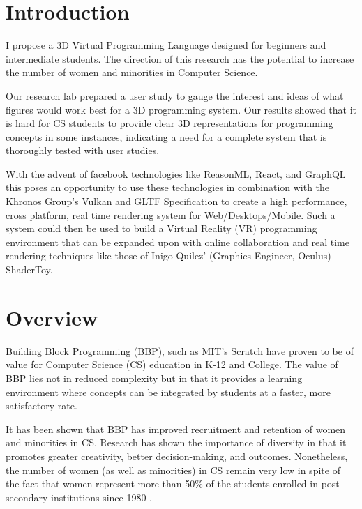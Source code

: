 \documentclass[10pt,a4paper]{article}
\begin{document}
\begin{multicols}{2}

\section{Introduction}

I propose a 3D Virtual Programming Language designed for beginners and intermediate students. The direction of this research has the potential to increase the number of women and minorities in Computer Science. 

Our research lab prepared a user study to gauge the interest and ideas of what figures would work best for a 3D programming system. Our results showed that it is hard for CS students to provide clear 3D representations for programming concepts in some instances, indicating a need for a complete system that is thoroughly tested with user studies.

With the advent of facebook technologies like ReasonML, React, and GraphQL this poses an opportunity to use these technologies in combination with the Khronos Group's Vulkan and GLTF Specification\cite{gltf} to create a high performance, cross platform, real time rendering system for Web/Desktops/Mobile. Such a system could then be used to build a Virtual Reality (VR) programming environment that can be expanded upon with online collaboration and real time rendering techniques like those of Inigo Quilez' (Graphics Engineer, Oculus) ShaderToy\cite{quilez}.

\section{Overview}

Building Block Programming (BBP), such as MIT's Scratch have proven to be of value for Computer Science (CS) education in K-12 and College. The value of BBP lies not in reduced complexity but in that it provides a learning environment where concepts can be integrated by students at a faster, more satisfactory rate.

It has been shown that BBP has improved recruitment and retention of women and minorities in CS. Research has shown the importance of diversity in that it promotes greater creativity, better decision-making, and outcomes. Nonetheless, the number of women (as well as minorities) in CS remain very low in spite of the fact that women represent more than 50\% of the students enrolled in post-secondary institutions since 1980 \cite{nces}. 


\end{multicols}
\end{document}
